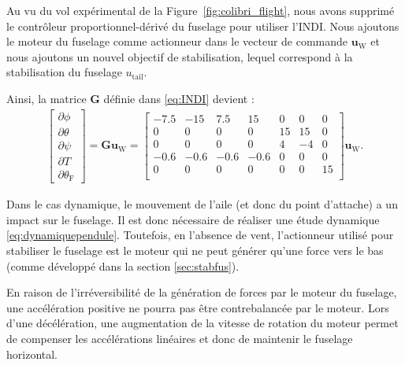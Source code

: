 Au vu du vol expérimental de la Figure~\ref{fig:colibri_flight}, nous avons supprimé le contrôleur proportionnel-dérivé du fuselage pour utiliser l'INDI. Nous ajoutons le moteur du fuselage comme actionneur dans le vecteur de commande $\boldsymbol{u}_{\text{W}}$ et nous ajoutons un nouvel objectif de stabilisation, lequel correspond à la stabilisation du fuselage $u_{\text{tail}}$.

Ainsi, la matrice $\boldsymbol{G}$ définie dans \eqref{eq:INDI} devient : 
\begin{align*}
    \begin{bmatrix}
    \partial \phi \\
    \partial \theta \\
    \partial \psi \\
    \partial T \\ 
    \partial \theta_{\text{F}}
    \end{bmatrix}\! =\! \boldsymbol{G} \boldsymbol{u}_{\text{W}} \!=\!
    \begin{bmatrix}
    -7.5 & -15 & 7.5 & 15 & 0 & 0 & 0\\
    0 & 0 & 0 & 0 & 15 & 15 & 0\\
    0 & 0 & 0 & 0 & 4 & -4 & 0 \\
    -0.6 & -0.6 & -0.6 & -0.6 & 0 & 0 & 0\\
    0 & 0 & 0 & 0 & 0 & 0 & 15 \\
    \end{bmatrix}
    \boldsymbol{u}_{\text{W}}.
\end{align*}


Dans le cas dynamique, le mouvement de l'aile (et donc du point d'attache) a un impact sur le fuselage. Il est donc nécessaire de réaliser une étude dynamique \eqref{eq:dynamiquependule}. Toutefois, en l'absence de vent, l'actionneur utilisé pour stabiliser le fuselage est le moteur qui ne peut générer qu'une force vers le bas (comme développé dans la section \ref{sec:stabfus}).
\begin{remark}
    \label{rem:irréversibilité}
    En raison de l'irréversibilité de la génération de forces par le moteur du fuselage, une accélération positive ne pourra pas être contrebalancée par le moteur. Lors d'une décélération, une augmentation de la vitesse de rotation du moteur permet de compenser les accélérations linéaires et donc de maintenir le fuselage horizontal.
\end{remark}

